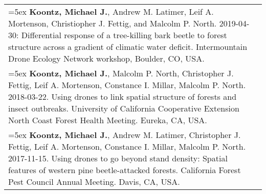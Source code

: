 \begin{longtable}{@{}>{\raggedright}p{5.25in} @{} >{\raggedleft}X@{}}
\hangindent=5ex \textbf{Koontz, Michael J.}, Andrew M. Latimer, Leif A. Mortenson, Christiopher J. Fettig, and Malcolm P. North. 2019-04-30: Differential response of a tree-killing bark beetle to forest structure across a gradient of climatic water deficit. Intermountain Drone Ecology Network workshop, Boulder, CO, USA. & 2019 \tabularnewline

\hangindent=5ex \textbf{Koontz, Michael J.}, Malcolm P. North, Christopher J. Fettig, Leif A. Mortenson, Constance I. Millar, Malcolm P. North. 2018-03-22. Using drones to link spatial structure of forests and insect outbreaks. University of California Cooperative Extension North Coast Forest Health Meeting. Eureka, CA, USA. & 2018 \tabularnewline

\hangindent=5ex \textbf{Koontz, Michael J.}, Andrew M. Latimer, Christopher J. Fettig, Leif A. Mortenson, Constance I. Millar, Malcolm P. North. 2017-11-15. Using drones to go beyond stand density: Spatial features of western pine beetle-attacked forests. California Forest Pest Council Annual Meeting. Davis, CA, USA. & 2017

\end{longtable}
